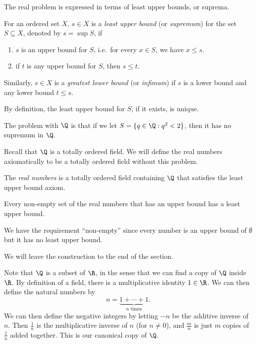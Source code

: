 \documentclass[a4paper]{article}
\begin{document}
The real problem is expressed in terms of least upper bounds, or suprema.

\begin{defi}
  For an ordered set $X$, $s\in X$ is a \emph{least upper bound} (or \emph{supremum}) for the set $S\subseteq X$, denoted by $s = \sup S$, if
  \begin{enumerate}
    \item $s$ is an upper bound for $S$, i.e.\ for every $x \in S$, we have $x \leq s$.
    \item if $t$ is any upper bound for $S$, then $s \leq t$.
  \end{enumerate}
  Similarly, $s\in X$ is a \emph{greatest lower bound} (or \emph{infimum}) if $s$ is a lower bound and any lower bound $t \leq s$.
\end{defi}
By definition, the least upper bound for $S$, if it exists, is unique.

The problem with $\Q$ is that if we let $S = \{q\in \Q: q^2 < 2\}$, then it has no supremum in $\Q$.

Recall that $\Q$ is a totally ordered field. We will define the real numbers axiomatically to be a totally ordered field without this problem.
\begin{defi}
  The \emph{real numbers} is a totally ordered field containing $\Q$ that satisfies the least upper bound axiom.
\end{defi}

\begin{axiom}
  Every non-empty set of the real numbers that has an upper bound has a least upper bound.
\end{axiom}
We have the requirement ``non-empty'' since every number is an upper bound of $\emptyset$ but it has no least upper bound.

We will leave the construction to the end of the section.

Note that $\Q$ is a subset of $\R$, in the sense that we can find a copy of $\Q$ inside $\R$. By definition of a field, there is a multiplicative identity $1 \in \R$. We can then define the natural numbers by
\[
  n = \underbrace{1 + \cdots + 1}_{n\text{ times}}.
\]
We can then define the negative integers by letting $-n$ be the additive inverse of $n$. Then $\frac{1}{n}$ is the multiplicative inverse of $n$ (for $n \not= 0$), and $\frac{m}{n}$ is just $m$ copies of $\frac{1}{n}$ added together. This is our canonical copy of $\Q$.
\end{document}
